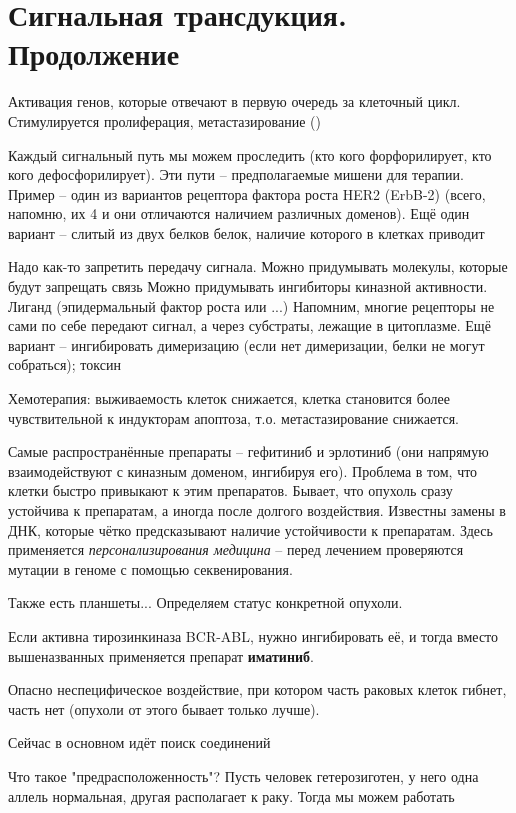 \documentclass[main.tex]{subfiles}
\begin{document}
\section{Сигнальная трансдукция. Продолжение}

Активация генов, которые отвечают в первую очередь за клеточный цикл.
Стимулируется пролиферация, метастазирование ()

Каждый сигнальный путь мы можем проследить (кто кого форфорилирует, кто кого дефосфорилирует).
Эти пути -- предполагаемые мишени для терапии.
Пример -- один из вариантов рецептора фактора роста HER2 (ErbB-2) (всего, напомню, их 4 и они отличаются наличием различных доменов).
Ещё один вариант -- слитый из двух белков белок, наличие которого в клетках приводит

Надо как-то запретить передачу сигнала.
Можно придумывать молекулы, которые будут запрещать связь 
Можно придумывать ингибиторы киназной активности. %
Лиганд (эпидермальный фактор роста или ...) %
Напомним, многие рецепторы не сами по себе передают сигнал, а через субстраты, лежащие в цитоплазме.
Ещё вариант -- ингибировать димеризацию (если нет димеризации, белки не могут собраться); токсин %

Хемотерапия: выживаемость клеток снижается, клетка становится более чувствительной к индукторам апоптоза, т.о. метастазирование снижается.

Самые распространённые препараты -- гефитиниб и эрлотиниб (они напрямую взаимодействуют с киназным доменом, ингибируя его).
Проблема в том, что клетки быстро привыкают к этим препаратов.
Бывает, что опухоль сразу устойчива к препаратам, а иногда после долгого воздействия.
Известны замены в ДНК, которые чётко предсказывают наличие устойчивости к препаратам.
Здесь применяется \emph{персонализирования медицина} -- перед лечением проверяются мутации в геноме с помощью секвенирования.

Также есть планшеты... %
Определяем статус конкретной опухоли.

Если активна тирозинкиназа BCR-ABL, нужно ингибировать её, и тогда вместо вышеназванных применяется препарат \textbf{иматиниб}. %

Опасно неспецифическое воздействие, при котором часть раковых клеток гибнет, часть нет (опухоли от этого бывает только лучше).

Сейчас в основном идёт поиск соединений

Что такое "предрасположенность"?
Пусть человек гетерозиготен, у него одна аллель нормальная, другая располагает к раку.
Тогда мы можем работать
\end{document}
